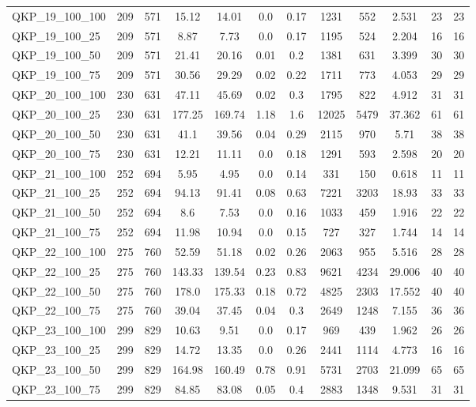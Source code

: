 \begin{table}[!h]
{\begin{tabular}{lccccccccccc}
QKP\_19\_100\_100 & 209 & 571 & 15.12 & 14.01 & 0.0 & 0.17 & 1231 & 552 & 2.531 & 23 & 23\\
QKP\_19\_100\_25 & 209 & 571 & 8.87 & 7.73 & 0.0 & 0.17 & 1195 & 524 & 2.204 & 16 & 16\\
QKP\_19\_100\_50 & 209 & 571 & 21.41 & 20.16 & 0.01 & 0.2 & 1381 & 631 & 3.399 & 30 & 30\\
QKP\_19\_100\_75 & 209 & 571 & 30.56 & 29.29 & 0.02 & 0.22 & 1711 & 773 & 4.053 & 29 & 29\\
QKP\_20\_100\_100 & 230 & 631 & 47.11 & 45.69 & 0.02 & 0.3 & 1795 & 822 & 4.912 & 31 & 31\\
QKP\_20\_100\_25 & 230 & 631 & 177.25 & 169.74 & 1.18 & 1.6 & 12025 & 5479 & 37.362 & 61 & 61\\
QKP\_20\_100\_50 & 230 & 631 & 41.1 & 39.56 & 0.04 & 0.29 & 2115 & 970 & 5.71 & 38 & 38\\
QKP\_20\_100\_75 & 230 & 631 & 12.21 & 11.11 & 0.0 & 0.18 & 1291 & 593 & 2.598 & 20 & 20\\
QKP\_21\_100\_100 & 252 & 694 & 5.95 & 4.95 & 0.0 & 0.14 & 331 & 150 & 0.618 & 11 & 11\\
QKP\_21\_100\_25 & 252 & 694 & 94.13 & 91.41 & 0.08 & 0.63 & 7221 & 3203 & 18.93 & 33 & 33\\
QKP\_21\_100\_50 & 252 & 694 & 8.6 & 7.53 & 0.0 & 0.16 & 1033 & 459 & 1.916 & 22 & 22\\
QKP\_21\_100\_75 & 252 & 694 & 11.98 & 10.94 & 0.0 & 0.15 & 727 & 327 & 1.744 & 14 & 14\\
QKP\_22\_100\_100 & 275 & 760 & 52.59 & 51.18 & 0.02 & 0.26 & 2063 & 955 & 5.516 & 28 & 28\\
QKP\_22\_100\_25 & 275 & 760 & 143.33 & 139.54 & 0.23 & 0.83 & 9621 & 4234 & 29.006 & 40 & 40\\
QKP\_22\_100\_50 & 275 & 760 & 178.0 & 175.33 & 0.18 & 0.72 & 4825 & 2303 & 17.552 & 40 & 40\\
QKP\_22\_100\_75 & 275 & 760 & 39.04 & 37.45 & 0.04 & 0.3 & 2649 & 1248 & 7.155 & 36 & 36\\
QKP\_23\_100\_100 & 299 & 829 & 10.63 & 9.51 & 0.0 & 0.17 & 969 & 439 & 1.962 & 26 & 26\\
QKP\_23\_100\_25 & 299 & 829 & 14.72 & 13.35 & 0.0 & 0.26 & 2441 & 1114 & 4.773 & 16 & 16\\
QKP\_23\_100\_50 & 299 & 829 & 164.98 & 160.49 & 0.78 & 0.91 & 5731 & 2703 & 21.099 & 65 & 65\\
QKP\_23\_100\_75 & 299 & 829 & 84.85 & 83.08 & 0.05 & 0.4 & 2883 & 1348 & 9.531 & 31 & 31\\

\end{tabular}}
\end{table}
